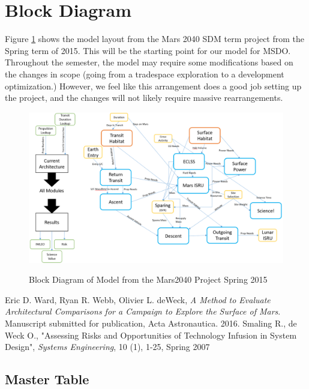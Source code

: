 \documentclass[11pt]{article} %
\begin{document}
\section{Block Diagram}
Figure \ref{fig:m2040block} shows the model layout from the Mars 2040 SDM term project from the Spring term of 2015.  This will be the starting point for our model for MSDO.  Throughout the semester, the model may require some modifications based on the changes in scope (going from a tradespace exploration to a development optimization.) However, we feel like this arrangement does a good job setting up the project, and the changes will not likely require massive rearrangements.
\begin{figure}
\includegraphics[width=\textwidth]{M2040Block}
\label{fig:m2040block}
\caption{Block Diagram of Model from the Mars2040 Project Spring 2015}
\end{figure}

\clearpage
\begin{thebibliography}{1}
 Eric D. Ward, Ryan R. Webb, Olivier L. deWeck, {\em A Method to Evaluate Architectural Comparisons for a Campaign to Explore the Surface of Mars}. Manuscript submitted for publication, Acta Astronautica. 2016.
Smaling R., de Weck O., "Assessing Risks and Opportunities of Technology Infusion in System Design", {\em Systems Engineering}, 10 (1), 1-25, Spring 2007
\end{thebibliography}

\clearpage
\begin{appendices}
\section{Master Table}

\end{appendices}
\end{document}
